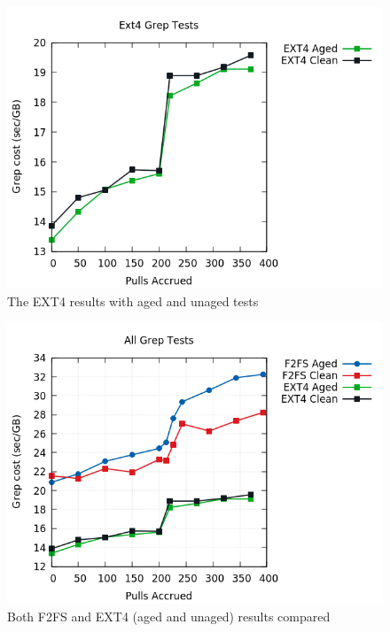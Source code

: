 \documentclass[a4paper, 10pt, conference]{ieeeconf}
\begin{document}
\begin{figure}
	\includegraphics[width=\linewidth]{ext4_aged.png}
	\caption{The EXT4 results with aged and unaged tests}
	\label{fig:f2fs}
\end{figure}

\begin{figure}
	\includegraphics[width=\linewidth]{All.png}
	\caption{Both F2FS and EXT4 (aged and unaged) results compared}
	\label{fig:f2fs}
\end{figure}



\addtolength{\textheight}{-12cm}   %
\end{document}

